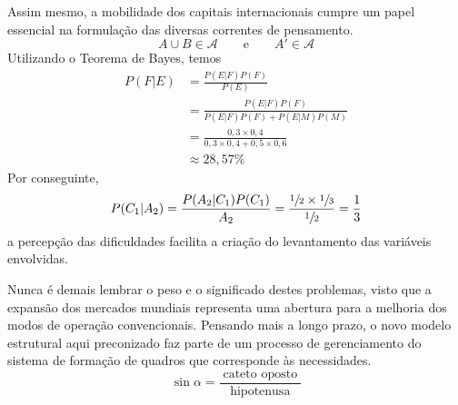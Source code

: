\begin{apendicesenv}
    Assim mesmo, a mobilidade dos capitais internacionais cumpre um papel essencial
    na formulação das diversas correntes de pensamento.
    \[ A\cup B \in \mathcal{A} \qquad  \text{e} \qquad  A'\in \mathcal{A} \]
    Utilizando o Teorema de Bayes, temos
    \begin{align*}
        P(F|E) & = \frac{P(E|F)P(F)}{P(E)}                                \\[3mm]
               & = \frac{P(E|F)P(F)}{P(E|F)P(F) + P(E|M)P(M)}             \\[3mm]
               & = \frac{0,3 \times 0,4}{0,3 \times 0,4 + 0,5 \times 0,6} \\[3mm]
               & \approx 28,57\%
    \end{align*}
    Por conseguinte,
    \[
        P(C_{1}|A_{2}) = \frac{P(A_{2}|C_{1})P(C_{1})}{A_{2}}
        = \frac{\sfrac{1}{2} \times \sfrac{1}{3}}{\sfrac{1}{2}}
        = \frac{1}{3}
    \]
    a percepção das dificuldades facilita a criação do levantamento
    das variáveis envolvidas.

    Nunca é demais lembrar o peso e o significado destes
    problemas, visto que a expansão dos mercados mundiais representa uma abertura
    para a melhoria dos modos de operação convencionais. Pensando mais a longo
    prazo, o novo modelo estrutural aqui preconizado faz parte de um processo de
    gerenciamento do sistema de formação de quadros que corresponde às necessidades.
    \[
        \sin \alpha = \frac{\;\text{cateto oposto}\;}{\text{hipotenusa}}
    \]


\end{apendicesenv}
